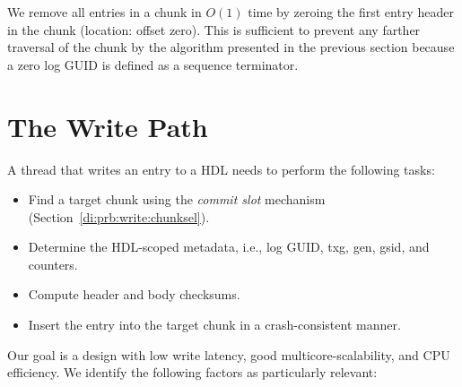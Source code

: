 \documentclass[12pt,a4paper,twoside]{book}
\begin{document}
We remove all entries in a chunk in $O(1)$ time by zeroing the first entry header in the chunk (location: offset zero).
This is sufficient to prevent any farther traversal of the chunk by the algorithm presented in the previous section because a zero log GUID is defined as a sequence terminator.

\section{The Write Path}\label{di:prb:write}
A thread that writes an entry to a HDL needs to perform the following tasks:
\begin{itemize}[noitemsep]
    \item Find a target chunk using the \textit{commit slot} mechanism (Section~\ref{di:prb:write:chunksel}).
    \item Determine the HDL-scoped metadata, i.e., log GUID, txg, gen, gsid, and counters.
    \item Compute header and body checksums.
    \item Insert the entry into the target chunk in a crash-consistent manner.
\end{itemize}
Our goal is a design with low write latency, good multicore-scalability, and CPU efficiency.
We identify the following factors as particularly relevant:
\end{document}
